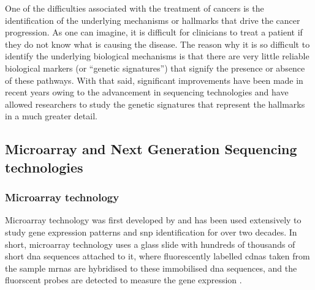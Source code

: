 One of the difficulties associated with the treatment of cancers is the identification of the underlying mechanisms or hallmarks that drive the cancer progression.
As one can imagine, it is difficult for clinicians to treat a patient if they do not know what is causing the disease.
The reason why it is so difficult to identify the underlying biological mechanisms is that there are very little reliable biological markers (or ``genetic signatures'') that signify the presence or absence of these pathways.
With that said, significant improvements have been made in recent years owing to the advancement in sequencing technologies and have allowed researchers to study the genetic signatures that represent the hallmarks in a much greater detail.

\subsection{Microarray and Next Generation Sequencing technologies}
\label{sub:microarray_and_next_generation_sequencing_technologies}

\subsubsection{Microarray technology}
\label{ssub:microarray_technology}

Microarray technology was first developed by \citet{Schena1995} and has been used extensively to study gene expression patterns and \gls{snp} identification for over two decades.
In short, microarray technology uses a glass slide with hundreds of thousands of short \acrshort{dna} sequences attached to it, where fluorescently labelled \glspl{cdna} taken from the sample \glspl{mrna} are hybridised to these immobilised \acrshort{dna} sequences, and the fluorscent probes are detected to measure the gene expression \citep{Schena1995,Schulze2001}.

